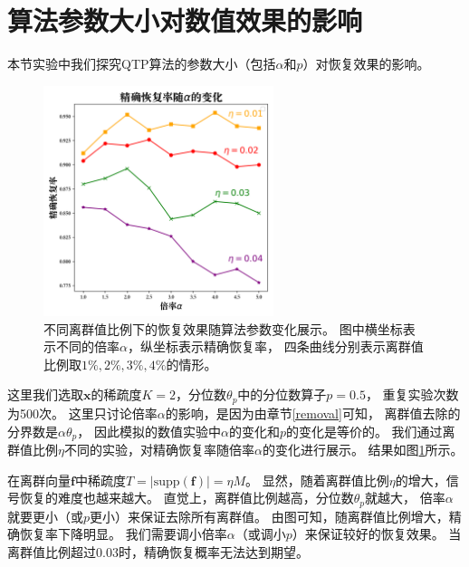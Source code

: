 \documentclass[AutoFakeBold]{LZUThesis}
\begin{document}

\section{算法参数大小对数值效果的影响}

\label{diff_params}
本节实验中我们探究QTP算法的参数大小（包括$\alpha$和$p$）对恢复效果的影响。

\begin{figure}[H]
    \centering
    \includegraphics[width=0.6\textwidth]{figures/diff_alpha.png}
    \caption{不同离群值比例下的恢复效果随算法参数变化展示。
        图中横坐标表示不同的倍率$\alpha$，纵坐标表示精确恢复率，
        四条曲线分别表示离群值比例取$1\%, 2\%, 3\%, 4\%$的情形。
        }
    \label{fig_diff_alg}
\end{figure}

这里我们选取$\mathbf{x}$的稀疏度$K = 2$，分位数$\theta_p$中的分位数算子$p = 0.5$，
重复实验次数为500次。
这里只讨论倍率$\alpha$的影响，是因为由章节\ref{removal}可知，
离群值去除的分界数是$\alpha \theta_p$，
因此模拟的数值实验中$\alpha$的变化和$p$的变化是等价的。
我们通过离群值比例$\eta$不同的实验，对精确恢复率随倍率$\alpha$的变化进行展示。
结果如图\ref{fig_diff_alg}所示。

在离群向量$\mathbf{f}$中稀疏度$T = \left | \mathrm{supp} (\mathbf{f}) \right | = \eta M$。
显然，随着离群值比例$\eta$的增大，信号恢复的难度也越来越大。
直觉上，离群值比例越高，分位数$\theta_p$就越大，
倍率$\alpha$就要更小（或$p$更小）来保证去除所有离群值。
由图可知，随离群值比例增大，精确恢复率下降明显。
我们需要调小倍率$\alpha$（或调小$p$）来保证较好的恢复效果。
当离群值比例超过0.03时，精确恢复概率无法达到期望。
\end{document}
